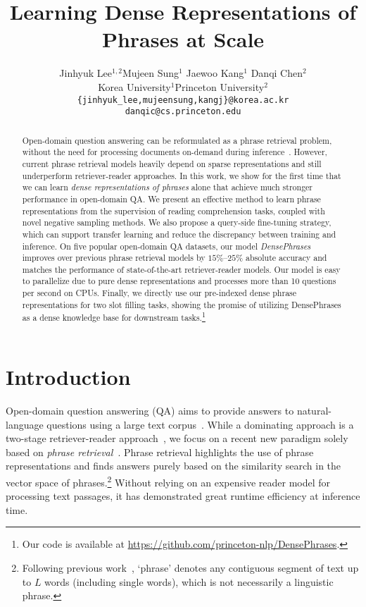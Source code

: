 \documentclass[11pt,a4paper]{article}
\title{Learning Dense Representations of Phrases at Scale}
\author{
  Jinhyuk Lee$^{1,2}$\Thanks{ Work partly done while visiting Princeton University.}\quad Mujeen Sung$^{1}$ \quad Jaewoo Kang$^{1}$ \quad Danqi Chen$^{2}$\\
  Korea University$^{1}$\quad Princeton University$^{2}$\\
  \texttt{\{jinhyuk\_lee,mujeensung,kangj\}@korea.ac.kr} \\
  \texttt{danqic@cs.princeton.edu} \\}
\date{}
\newcommand\ti[1]{\textit{#1}}
\begin{document}
\maketitle



\begin{abstract}
Open-domain question answering can be reformulated as a phrase retrieval problem, without the need for processing documents on-demand during inference~\citep{seo2019real}.
However, current phrase retrieval models heavily depend on sparse representations and still underperform retriever-reader approaches.
In this work, we show for the first time that we can learn \ti{dense representations of phrases} alone that achieve much stronger performance in open-domain QA.
We present an effective method to learn phrase representations from the supervision of reading comprehension tasks, coupled with novel negative sampling methods.
We also propose a query-side fine-tuning strategy, which can support transfer learning and reduce the discrepancy between training and inference.
On five popular open-domain QA datasets, our model \ti{DensePhrases} improves over previous phrase retrieval models by $15\%$--$25\%$ absolute accuracy and matches the performance of state-of-the-art retriever-reader models.
Our model is easy to parallelize due to pure dense representations and processes more than 10 questions per second on CPUs.
Finally, we directly use our pre-indexed dense phrase representations for two slot filling tasks, showing the promise of utilizing {DensePhrases} as a dense knowledge base for downstream tasks.\footnote{Our code is available at \url{https://github.com/princeton-nlp/DensePhrases}.}


\end{abstract}
 

\section{Introduction}
\label{sec:intro}

Open-domain question answering (QA) aims to provide answers to natural-language questions using a large text corpus~\citep{voorhees1999trec,ferrucci2010building,chen2020open}.
While a dominating approach is a two-stage retriever-reader approach~\citep{chen2017reading,lee2019latent,guu2020realm,karpukhin2020dense},
we focus on a recent new paradigm solely based on \textit{phrase retrieval}~\citep{seo2019real,lee2020contextualized}.
Phrase retrieval highlights the use of phrase representations and finds answers purely based on the similarity search in the vector space of phrases.\footnote{Following previous work~\citep{seo2018phrase}, `phrase' denotes any contiguous segment of text up to $L$ words (including single words), which is not necessarily a linguistic phrase.}
Without relying on an expensive reader model for processing text passages, it has demonstrated great runtime efficiency at inference time.
\end{document}
